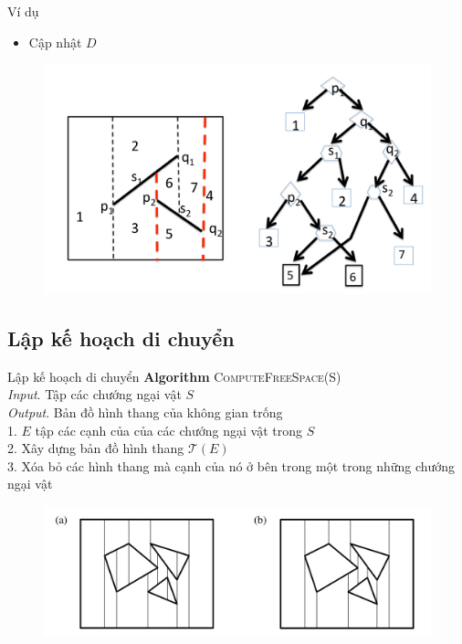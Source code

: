 \documentclass[compress]{beamer}
\begin{document}
\begin{frame}{Ví dụ}
\begin{itemize}
\item Cập nhật $D$
\end{itemize}
\begin{figure}[H]
\centering
\includegraphics[scale=0.3]{tree_search_final.png}
\end{figure}
\end{frame}

\subsection{Lập kế hoạch di chuyển}
\begin{frame}{Lập kế hoạch di chuyển}
\textbf{Algorithm} \textsc{ComputeFreeSpace(S)}\\
\emph{Input}. Tập các chướng ngại vật $S$\\
\emph{Output}. Bản đồ hình thang của không gian trống\\
1. $E$ tập các cạnh của của các chướng ngại vật trong $S$\\
2. Xây dựng bản đồ hình thang $\mathcal{T}(E)$\\
3. Xóa bỏ các hình thang mà cạnh của nó ở bên trong một trong những chướng ngại vật
\begin{figure}[H]
\centering
\includegraphics[scale=0.25]{trapezoidal_free_space.png}
\end{figure}
\end{frame}
\end{document}
